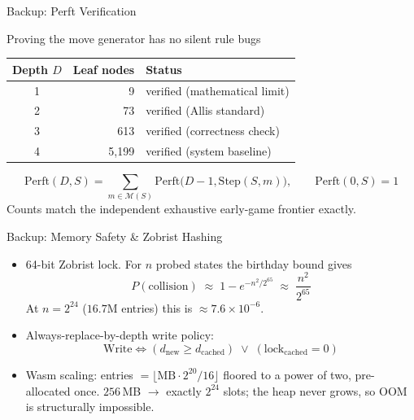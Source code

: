 \documentclass[aspectratio=169]{beamer}
\renewcommand{\framesubtitle}[1]{%
  {\usebeamerfont{framesubtitle}\color{cMuted}\small #1\par\vspace{3pt}}}
\begin{document}
\appendix

\begin{frame}{Backup: Perft Verification}
  \framesubtitle{Proving the move generator has no silent rule bugs}
  \centering
  \begin{table}
    \begin{tabular}{crl}
      \toprule
      \textbf{Depth $D$} & \textbf{Leaf nodes} & \textbf{Status} \\
      \midrule
      1 & 9        & verified (mathematical limit) \\
      2 & 73       & verified (Allis standard) \\
      3 & 613      & verified (correctness check) \\
      4 & 5{,}199  & verified (system baseline) \\
      \bottomrule
    \end{tabular}
  \end{table}
  \[ \mathrm{Perft}(D,S)=\sum_{m\in\mathcal{M}(S)}\mathrm{Perft}\big(D-1,\mathrm{Step}(S,m)\big),
     \qquad \mathrm{Perft}(0,S)=1 \]
  {\scriptsize\color{cMuted} Counts match the independent exhaustive early-game frontier exactly.}
\end{frame}

\begin{frame}{Backup: Memory Safety \& Zobrist Hashing}
  \begin{itemize}
    \item 64-bit Zobrist lock. For $n$ probed states the birthday bound gives
      \[ P(\text{collision}) \;\approx\; 1-e^{-n^{2}/2^{65}} \;\approx\; \frac{n^{2}}{2^{65}} \]
      At $n=2^{24}$ ($16.7$M entries) this is $\approx 7.6\times10^{-6}$.
    \item Always-replace-by-depth write policy:
      \[ \text{Write} \iff (d_{\text{new}} \ge d_{\text{cached}}) \;\lor\; (\text{lock}_{\text{cached}}=0) \]
    \item Wasm scaling: entries $=\big\lfloor \text{MB}\cdot2^{20}/16 \big\rfloor$ floored to a power of
          two, pre-allocated once. $256$\,MB $\rightarrow$ exactly $2^{24}$ slots; the heap
          never grows, so OOM is structurally impossible.
  \end{itemize}
\end{frame}
\end{document}
